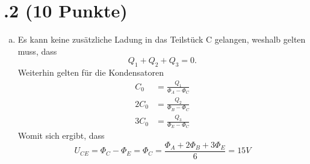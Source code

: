 \section*{\nr.2 \tittwo (10 Punkte)}
\begin{enumerate}[(a)]
\item Es kann keine zusätzliche Ladung in das Teilstück C gelangen, weshalb gelten muss, dass
\begin{equation}
  Q_1+Q_2+Q_3=0.
\end{equation}
Weiterhin gelten für die Kondensatoren
\begin{align}
  C_0&=\frac{Q_1}{\Phi_A-\Phi_C}\\
  2C_0&=\frac{Q_2}{\Phi_B-\Phi_C}\\
  3C_0&=\frac{Q_3}{\Phi_E-\Phi_C}
\end{align}
Womit sich ergibt, dass
\begin{equation}
  U_{CE}=\Phi_C-\Phi_E=\Phi_C=\frac{\Phi_A+2\Phi_B+3\Phi_E}{6}=15V
\end{equation}


\end{enumerate}